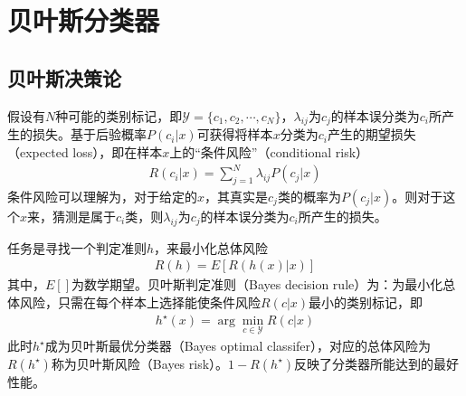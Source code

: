 \section{贝叶斯分类器}
\subsection{贝叶斯决策论}
假设有$N$种可能的类别标记，即$\mathcal{Y}=\{c_1,c_2,\cdots,c_N\}$，$\lambda_{ij}$为$c_j$的样本误分类为$c_i$所产生的损失。基于后验概率$P(c_i|x)$可获得将样本$x$分类为$c_i$产生的期望损失（expected loss），即在样本$x$上的“条件风险”（conditional risk）
\begin{eqnarray}
R(c_i|x)=\sum_{j=1}^N \lambda_{ij}P(c_j|x)
\end{eqnarray}
条件风险可以理解为，对于给定的$x$，其真实是$c_j$类的概率为$P(c_j|x)$。则对于这个$x$来，猜测是属于$c_i$类，则$\lambda_{ij}$为$c_j$的样本误分类为$c_i$所产生的损失。

任务是寻找一个判定准则$h$，来最小化总体风险
\begin{eqnarray}
R(h)=E[R(h(x)|x)]
\end{eqnarray}
其中，$E[]$为数学期望。贝叶斯判定准则（Bayes decision rule）为：为最小化总体风险，只需在每个样本上选择能使条件风险$R(c|x)$最小的类别标记，即
\begin{eqnarray}
h^\star(x)=\arg\min_{c\in\mathcal{Y}}R(c|x)
\end{eqnarray}
此时$h^\star$成为贝叶斯最优分类器（Bayes optimal classifer），对应的总体风险为$R(h^\star)$称为贝叶斯风险（Bayes risk）。$1-R(h^\star)$反映了分类器所能达到的最好性能。 

